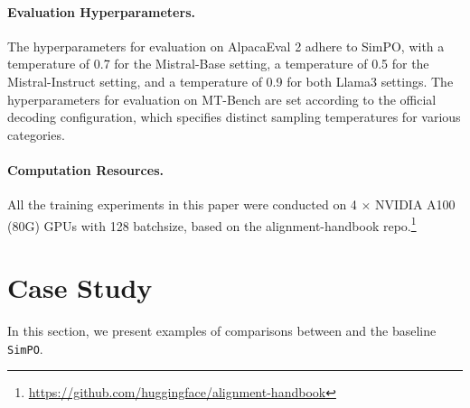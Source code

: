 \paragraph{Evaluation Hyperparameters.}
The hyperparameters for evaluation on AlpacaEval 2 adhere to SimPO, with a temperature of 0.7 for the Mistral-Base setting, a temperature of 0.5 for the Mistral-Instruct setting, and a temperature of 0.9 for both Llama3 settings. The hyperparameters for evaluation on MT-Bench are set according to the official decoding configuration, which specifies distinct sampling temperatures for various categories.

\paragraph{Computation Resources.} 
All the training experiments in this paper were conducted on 4 $\times$ NVIDIA A100 (80G) GPUs with 128 batchsize, based on the alignment-handbook repo.\footnote{\url{https://github.com/huggingface/alignment-handbook}}





\section{Case Study}
\label{app:evaluation}

In this section, we present examples of comparisons between \method  and the baseline \texttt{SimPO}. 





